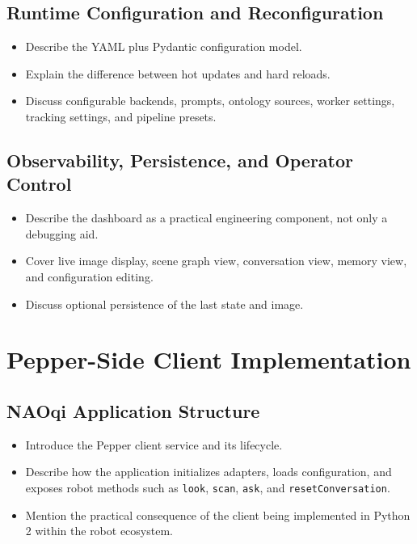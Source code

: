 \documentclass[
  digital,     %
  oneside,     %
  nosansbold,  %
  nocolorbold, %
  lof,         %
  lot,         %
]{fithesis4}
\begin{document}
\section{Runtime Configuration and Reconfiguration}
\begin{itemize}
    \item Describe the YAML plus Pydantic configuration model.
    \item Explain the difference between hot updates and hard reloads.
    \item Discuss configurable backends, prompts, ontology sources, worker settings, tracking settings, and pipeline presets.
\end{itemize}

\section{Observability, Persistence, and Operator Control}
\begin{itemize}
    \item Describe the dashboard as a practical engineering component, not only a debugging aid.
    \item Cover live image display, scene graph view, conversation view, memory view, and configuration editing.
    \item Discuss optional persistence of the last state and image.
\end{itemize}

\chapter{Pepper-Side Client Implementation}

\section{NAOqi Application Structure}
\begin{itemize}
    \item Introduce the Pepper client service and its lifecycle.
    \item Describe how the application initializes adapters, loads configuration, and exposes robot methods such as \texttt{look}, \texttt{scan}, \texttt{ask}, and \texttt{resetConversation}.
    \item Mention the practical consequence of the client being implemented in Python 2 within the robot ecosystem.
\end{itemize}
\end{document}
